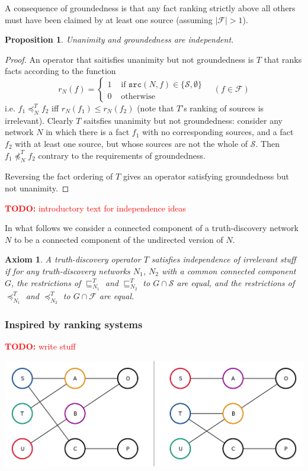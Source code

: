 \documentclass{article}
\theoremstyle{definition} \newtheorem{definition}{Definition}
\theoremstyle{definition} \newtheorem{example}{Example}
\theoremstyle{plain} \newtheorem{axiom}{Axiom}
\theoremstyle{plain} \newtheorem*{remark}{Remark}
\theoremstyle{remark} \newtheorem*{notation}{Notation}
\theoremstyle{plain} \newtheorem{lemma}{Lemma}
\theoremstyle{plain} \newtheorem{proposition}{Proposition}
\newcommand{\todo}[1] {
    \textcolor{red}{
        \textbf{TODO:} #1
    }
}
\renewcommand{\S}{\mathcal{S}}  %
\newcommand{\F}{\mathcal{F}}
\newcommand{\sle}{\sqsubseteq}
\newcommand{\fle}{\preceq}
\newcommand{\src}{\texttt{src}}
\begin{document}
A consequence of groundedness is that any fact ranking strictly above all
others must have been claimed by at least one source (assuming $|\F|>1$).

\begin{proposition}
Unanimity and groundedness are independent.
\end{proposition}

\begin{proof}
An operator that saitisfies unanimity but not groundedness is $T$ that ranks
facts according to the function
$$
    r_N(f) = \begin{cases}
        1 & \text{ if } \src(N, f) \in \{\S, \emptyset\} \\
        0 & \text{ otherwise}
    \end{cases}
    \quad (f \in \F)
$$
i.e. $f_1 \fle_N^T f_2$ iff $r_N(f_1) \le r_N(f_2)$ (note that $T$'s ranking of
sources is irrelevant). Clearly $T$ saitsfies unanimity but not groundedness:
consider any network $N$ in which there is a fact $f_1$ with no corresponding
sources, and a fact $f_2$ with at least one source, but whose sources are not
the whole of $\S$. Then $f_1 \not\fle_N^T f_2$ contrary to the requirements of
groundedness.

Reversing the fact ordering of $T$ gives an operator satisfying groundedness
but not unanimity.
\end{proof}

\todo{introductory text for independence ideas}

In what follows we consider a connected component of a truth-discovery network
$N$ to be a connected component of the undirected version of $N$.

\begin{axiom}
A truth-discovery operator $T$ satisfies \emph{independence of irrelevant
stuff} if for any truth-discovery networks $N_1$, $N_2$ with a common connected
component $G$, the restrictions of $\sle_{N_1}^T$ and $\sle_{N_2}^T$ to $G \cap
\S$ are equal, and the restrictions of $\fle_{N_1}^T$ and $\fle_{N_2}^T$ to $G
\cap \F$ are equal.
\end{axiom}

\subsubsection{Inspired by ranking systems}
\todo{write stuff}

{
    \centering
    \includegraphics[width=\linewidth]{symmetry_example}
    \label{img:permutation_of_a_tdn}
}

{}


\end{document}
